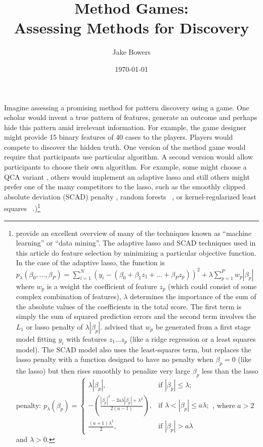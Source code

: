 \documentclass[12pt]{article}
\title{Method Games:\\ Assessing Methods for Discovery}
\author{Jake Bowers}
\date{\today}
\begin{document}
\maketitle

Imagine assessing a promising method for pattern discovery using a game.  One
scholar would invent a true pattern of features, generate an outcome and
perhaps hide this pattern amid irrelevant information.  For example, the game
designer might provide 15 binary features of 40 cases to the players. Players
would compete to discover the hidden truth.  One version of the method game
would require that participants use particular algorithm. A second version
would allow participants to choose their own algorithm. For example, some
might choose a QCA variant \citep{rihoux2008configurational}, others would
implement an adaptive lasso \citep{zou2006adaptive} and still others might
prefer one of the many competitors to the lasso, such as the smoothly clipped
absolute deviation (SCAD) penalty \citep{fan2001variable}, random forests
~\citep{breiman2001random}, or kernel-regularized least squares
~\citep{hainmueller2012kernel}.)\footnote{\citet{hasttibfried09} provide an
  excellent overview of many of the techniques known as
  ``machine learning'' or ``data mining''. The adaptive lasso and SCAD
  techniques used in this article do feature selection by minimizing a
  particular objective function. In the case of the adaptive lasso, the
  function is $p_{\lambda}(\beta_0, \ldots, \beta_P)=\sum_{i=1}^N (y_i - ( \beta_0 + \beta_1 z_1 + \ldots + \beta_P
  z_p) )^2 + \lambda \sum_{p=1}^P w_p|\beta_p|$ where $w_p$ is a weight the
  coefficient of feature $z_p$ (which could consist of some complex
  combination of features), $\lambda$ determines the importance of the sum of
  the absolute values of the coefficients in the total score. The first
  term is simply the sum of squared prediction errors and the second term
  involves the $L_1$ or lasso penalty of $\lambda|\beta_p|$. \citet{zou2006adaptive}
  advised that $w_p$ be generated from a first stage model fitting $y_i$ with
  features $z_1 \ldots z_p$ (like a ridge regression or a least squares
  model). The SCAD model also uses the least-squares term, but replaces the
  lasso penalty with a function designed to have no penalty when $\beta_p=0$
  (like the lasso) but then rises smoothly to penalize very large $\beta_p$ less than the
  lasso penalty: $p_{\lambda}(\beta_p)=\begin{cases}
    \lambda |\beta_p|, & \text{if } |\beta_p|\le \lambda; \\
    - \left( \frac{|\beta_p|^2 - 2 a \lambda |\beta_p| + \lambda^2}{2 (a-1)} \right), & \text{if } \lambda < |\beta_p| \le a \lambda; \\
    \frac{(a+1)\lambda^2}{2},  & \text{if } |\beta_p| > a \lambda 
  \end{cases}$, where $a > 2$ and $\lambda > 0$.
 }
 
\end{document}
